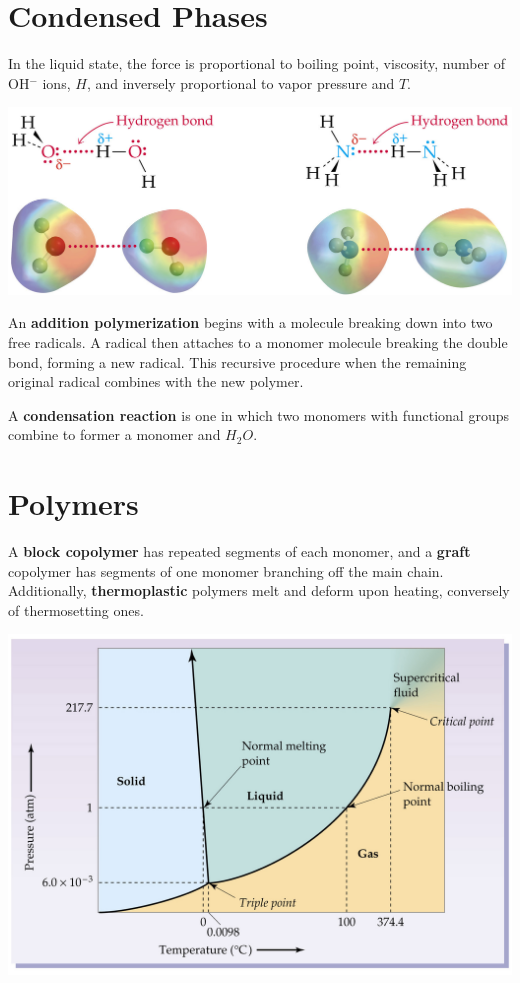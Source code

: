 \documentclass{tufte-book}
\renewcommand{\emph}[1]{\textbf{#1}}
\begin{document}
\section{Condensed Phases}
In the liquid state, the force is proportional to boiling point, viscosity, number of OH$^-$ ions, $H$, and inversely proportional to vapor pressure and $T$.
%
\begin{marginfigure}[0mm]
\begin{center}
  \includegraphics[width=\textwidth]{hydrogen}
\end{center}
\end{marginfigure}

\bigskip
An \emph{addition polymerization} begins with a molecule breaking down into two free radicals. A radical then attaches to a monomer molecule breaking the double bond, forming a new radical. This recursive procedure when the remaining original radical combines with the new polymer.

\bigskip
A \emph{condensation reaction} is one in which two monomers with functional groups combine to former a monomer and $H_2O$.

\section{Polymers}
A \emph{block copolymer} has repeated segments of each monomer, and a \emph{graft} copolymer has segments of one monomer branching off the main chain. Additionally, \emph{thermoplastic} polymers melt and deform upon heating, conversely of thermosetting ones.
%
\begin{marginfigure}[0mm]
\begin{center}
  \includegraphics[width=\textwidth]{phases}
\end{center}
\end{marginfigure}
\end{document}
